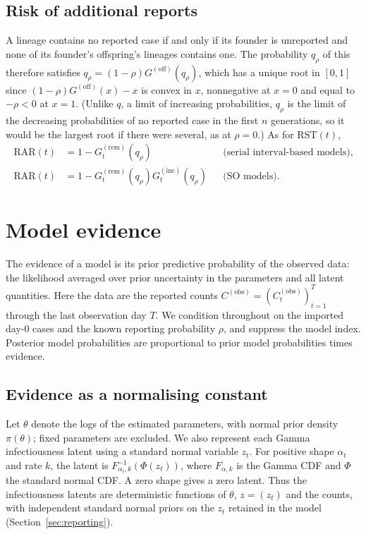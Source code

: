 \documentclass{article}
\newcommand{\offPGF}{G^{(\mathrm{off})}}
\newcommand{\RST}{\mathrm{RST}}
\newcommand{\RAR}{\mathrm{RAR}}
\begin{document}
\subsection{Risk of additional reports}

A lineage contains no reported case if and only if its founder is
unreported and none of its founder's offspring's lineages contains one.
The probability \(q_\rho\) of this therefore satisfies
\(q_\rho=(1-\rho)\offPGF(q_\rho)\), which has a unique root in \([0,1]\)
since \((1-\rho)\offPGF(x)-x\) is convex in \(x\), nonnegative at \(x=0\)
and equal to \(-\rho<0\) at \(x=1\). (Unlike \(q\), a limit of increasing
probabilities, \(q_\rho\) is the limit of the decreasing probabilities of
no reported case in the first \(n\) generations, so it would be the largest
root if there were several, as at \(\rho=0\).) As for \(\RST(t)\),
\begin{align}
  \RAR(t)&=1-G_t^{(\mathrm{rem})}(q_\rho)
  &&\text{(serial interval-based models)},\\
  \RAR(t)&=1-G_t^{(\mathrm{rem})}(q_\rho)G_t^{(\mathrm{inc})}(q_\rho)
  &&\text{(SO models)}.
\end{align}

\section{Model evidence}
\label{sec:evidence}

The evidence of a model is its prior predictive probability of the observed
data: the likelihood averaged over prior uncertainty in the parameters and
all latent quantities. Here the data are the reported counts
\(C^{(\mathrm{obs})}=(C_t^{(\mathrm{obs})})_{t=1}^{T}\) through the last
observation day \(T\). We condition throughout on the imported day-0 cases
and the known reporting probability \(\rho\), and suppress the model index.
Posterior model probabilities are proportional to prior model probabilities
times evidence.

\subsection{Evidence as a normalising constant}

Let \(\theta\) denote the logs of the estimated parameters, with normal
prior density \(\pi(\theta)\); fixed parameters are excluded. We also
represent each Gamma infectiousness latent using a standard normal variable
\(z_t\). For positive shape \(\alpha_t\) and rate \(k\), the latent is
\(F_{\alpha_t,k}^{-1}(\Phi(z_t))\), where \(F_{\alpha,k}\) is the Gamma CDF
and \(\Phi\) the standard normal CDF. A zero shape gives a zero latent.
Thus the infectiousness latents are deterministic functions of
\(\theta\), \(z=(z_t)\) and the counts, with independent standard normal
priors on the \(z_t\) retained in the model
(Section~\ref{sec:reporting}).
\end{document}
